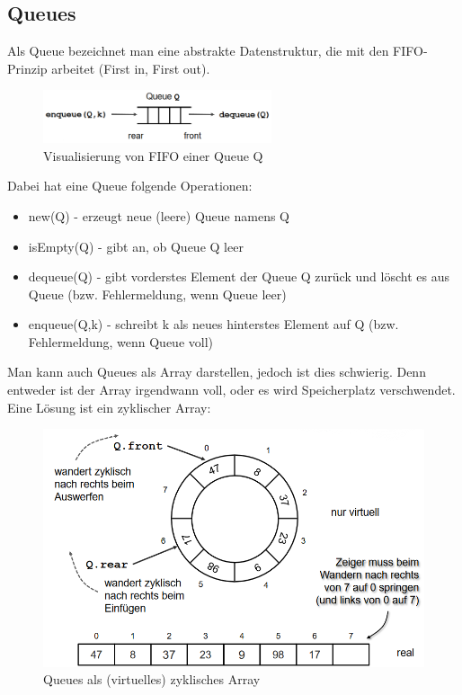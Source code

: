 \documentclass{article}
\begin{document}
        \subsection{Queues}
            Als Queue bezeichnet man eine abstrakte Datenstruktur, die mit den FIFO- Prinzip arbeitet (First in, First out). 
            \begin{figure}[ht]
                \centering
                \includegraphics[width=0.6\textwidth]{Bilder/QueueFIFO.png}
                \caption{Visualisierung von FIFO einer Queue Q}
                \label{fig:FIFO}
            \end{figure}
            Dabei hat eine Queue folgende Operationen:
            \begin{itemize}
                \item new(Q) - erzeugt neue (leere) Queue namens Q
                \item isEmpty(Q) - gibt an, ob Queue Q leer
                \item dequeue(Q) - gibt vorderstes Element der Queue Q zurück und löscht es aus Queue (bzw. Fehlermeldung, wenn Queue leer)
                \item enqueue(Q,k) - schreibt k als neues hinterstes Element auf Q (bzw. Fehlermeldung, wenn Queue voll)
            \end{itemize}
            Man kann auch Queues als Array darstellen, jedoch ist dies schwierig. Denn entweder ist der Array irgendwann voll, oder es wird Speicherplatz verschwendet.\\
            Eine Lösung ist ein zyklischer Array:
            \begin{figure}[ht]
                \centering
                \includegraphics[width=1\textwidth]{Bilder/ZyklischerArray.png}
                \caption{Queues als (virtuelles) zyklisches Array}
                \label{fig:ZyklischerArray}
            \end{figure}
\end{document}
